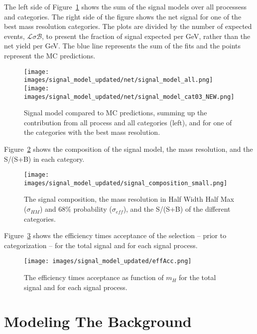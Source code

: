 The left side of Figure~\ref{sigmodel:all} shows the sum of the signal models over all processess and categories. The right side of the figure shows the net signal for one of the best mass resolution categories. The plots are divided by the number of expected events, $\mathcal{L}\sigma\mathcal{B}$, to present the fraction of signal expected per GeV, rather than the net yield per GeV. The blue line represents the sum of the fits and the points represent the MC predictions. 
\begin{figure}[h!]
    \centering
    \texttt{[image: images/signal\_model\_updated/net/signal\_model\_all.png]}
    \texttt{[image: images/signal\_model\_updated/net/signal\_model\_cat03\_NEW.png]}
    \caption[The signal model compared to MC predictions.]
    {Signal model compared to MC predictions, summing up the contribution from all process and all categories (left), and for one of the categories with the best mass resolution.}
    \label{sigmodel:all}
\end{figure}
Figure~\ref{sigmodel:comp} shows the composition of the signal model, the mass resolution, and the S/(S+B) in each category.
\begin{figure}[h!]
    \centering
    \texttt{[image: images/signal\_model\_updated/signal\_composition\_small.png]}
    \caption[The signal composition, resolution, and purity in the different categories.]
    {The signal composition, the mass resolution in Half Width Half Max ($\sigma_{HM}$) and 68\% probability ($\sigma_{eff}$), and the S/(S+B) of the different categories.}
    \label{sigmodel:comp}
\end{figure}
Figure~\ref{sigmodel:effacc} shows the efficiency times acceptance of the selection --  prior to categorization -- for the total signal and for each signal process.
\begin{figure}[h!]
    \texttt{[image: images/signal\_model\_updated/effAcc.png]}
    \caption[The efficiency times acceptance versus the Higgs mass.]
    {The efficiency times acceptance as function of $m_H$ for the total signal and for each signal process.}
    \label{sigmodel:effacc}
\end{figure}
\section{Modeling The Background}

